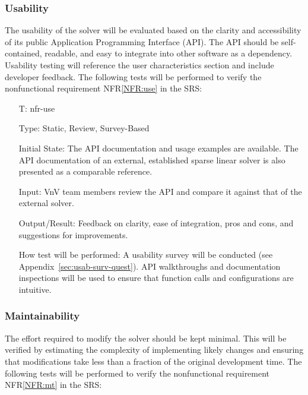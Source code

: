 \documentclass[12pt, titlepage]{article}
\newcounter{testnum} %
\newcommand{\nfrref}[1]{NFR\ref{#1}}
\begin{document}
\subsubsection{Usability}
\label{sec:usability}

The usability of the solver will be evaluated based on the clarity and
accessibility of its public Application Programming Interface (API). The API
should be self-contained, readable, and easy to integrate into other software as
a dependency. Usability testing will reference the user characteristics section
and include developer feedback. The following tests will be performed to verify
the nonfunctional requirement \nfrref{NFR:use} in the SRS:

\begin{itemize}

\item[T\refstepcounter{testnum}\thetestnum \label{T:use}:]{nfr-use}

Type: Static, Review, Survey-Based

Initial State: The API documentation and usage examples are available. The API
documentation of an external, established sparse linear solver is also presented
as a comparable reference.

Input: VnV team members review the API and compare it against that of the
external solver.

Output/Result: Feedback on clarity, ease of integration, pros and cons, and
suggestions for improvements.

How test will be performed: A usability survey will be conducted (see
Appendix~\ref{sec:usab-surv-quest}). API walkthroughs and documentation inspections
will be used to ensure that function calls and configurations are intuitive.

\end{itemize}

\subsubsection{Maintainability}

The effort required to modify the solver should be kept minimal. This will be
verified by estimating the complexity of implementing likely changes and
ensuring that modifications take less than a fraction of the original
development time. The following tests will be performed to verify the
nonfunctional requirement \nfrref{NFR:mt} in the SRS:
\end{document}
